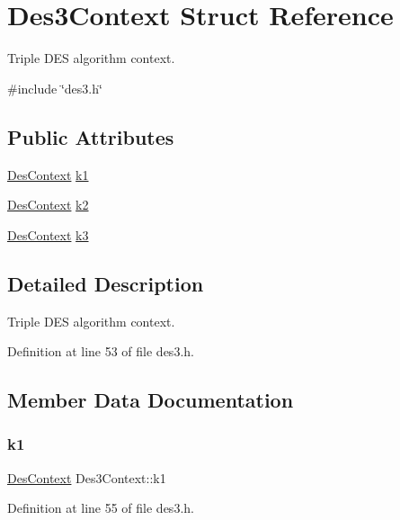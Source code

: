 \hypertarget{structDes3Context}{}\section{Des3\+Context Struct Reference}
\label{structDes3Context}


Triple D\+ES algorithm context.  




{\ttfamily \#include \char`\"{}des3.\+h\char`\"{}}

\subsection*{Public Attributes}
\begin{DoxyCompactItemize}
\item 
\hyperlink{structDesContext}{Des\+Context} \hyperlink{structDes3Context_a1ab518552a02d4488c4fb72f961c09b9}{k1}
\item 
\hyperlink{structDesContext}{Des\+Context} \hyperlink{structDes3Context_a68cb8fdee2e8cbd2af7cdac16201766e}{k2}
\item 
\hyperlink{structDesContext}{Des\+Context} \hyperlink{structDes3Context_ab68be5d202fbef6ce3d5e3bb10b29a8f}{k3}
\end{DoxyCompactItemize}


\subsection{Detailed Description}
Triple D\+ES algorithm context. 

Definition at line 53 of file des3.\+h.



\subsection{Member Data Documentation}
\mbox{\label{structDes3Context_a1ab518552a02d4488c4fb72f961c09b9}} 
\subsubsection{\texorpdfstring{k1}{k1}}
{\footnotesize\ttfamily \hyperlink{structDesContext}{Des\+Context} Des3\+Context\+::k1}



Definition at line 55 of file des3.\+h.

